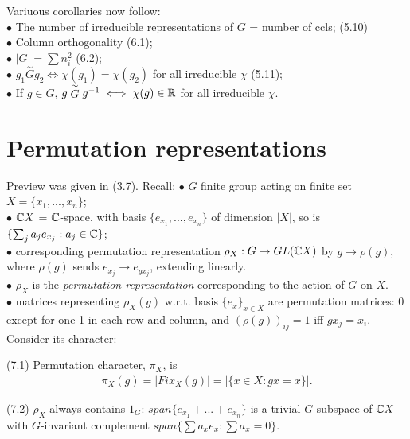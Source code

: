 \documentclass[a4paper]{article}
\begin{document}
Variuous corollaries now follow:\\
$\bullet$ The number of irreducible representations of $G$ = number of ccls; (5.10)\\
$\bullet$ Column orthogonality (6.1);\\
$\bullet$ $|G| = \sum n_i^2$ (6.2);\\
$\bullet$ $g_1 \stackrel{\sim}{G} g_2 \iff \chi(g_1) = \chi(g_2)$ for all irreducible $\chi$ (5.11);\\
$\bullet$ If $g \in G$, $g \stackrel{\sim}{G} g^{-1} \iff \chi(g) \in \mathbb{R}$ for all irreducible $\chi$.

\newpage

\section{Permutation representations}
Preview was given in (3.7). Recall:
$\bullet$ $G$ finite group acting on finite set $X = \{x_1,...,x_n\}$;\\
$\bullet$ $\mathbb{C} X$ = $\mathbb{C}$-space, with basis $\{e_{x_1},...,e_{x_n}\}$ of dimension $|X|$, so is $\{\sum_j a_j e_{x_j}: a_j \in \mathbb{C}\}$;\\
$\bullet$ corresponding permutation representation $\rho_X:G \to GL(\mathbb{C} X)$ by $g \to \rho(g)$, where $\rho(g)$ sends $e_{x_j} \to e_{gx_j}$, extending linearly.\\
$\bullet$ $\rho_X$ is the \emph{permutation representation} corresponding to the action of $G$ on $X$.\\
$\bullet$ matrices representing $\rho_X(g)$ w.r.t. basis $\{e_x\}_{x \in X}$ are permutation matrices: 0 except for one 1 in each row and column, and $(\rho(g))_{ij} = 1$ iff $gx_j = x_i$. Consider its character:

(7.1) Permutation character, $\pi_X$, is
\begin{equation*}
\begin{aligned}
\pi_X(g) = |Fix_X(g)| =|\{x \in X:gx = x\}|.
\end{aligned}
\end{equation*}

(7.2) $\rho_X$ always contains $1_G$: $span \{e_{x_1}+...+e_{x_n}\}$ is a trivial $G$-subspace of $\mathbb{C} X$ with $G$-invariant complement $span\{\sum a_x e_x: \sum a_x = 0\}$.
\end{document}
